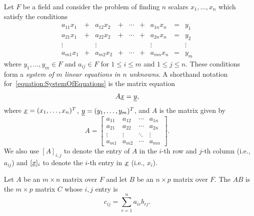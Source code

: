 Let $F$ be a field and consider the problem of finding $n$ scalars $x_1, \ldots, x_n$ which satisfy the conditions
\begin{equation} \label{equation:SystemOfEquations}
\begin{array}{ccccccccc}
a_{11} x_1 & + & a_{12} x_2 & + & \cdots & + & a_{1n} x_n & = & y_1 \\
a_{21} x_1 & + & a_{22} x_2 & + & \cdots & + & a_{2n} x_n & = & y_2 \\
\vdots & & \vdots  & & & & \vdots & & \vdots \\
a_{m1} x_1 & + & a_{m2} x_2 & + & \cdots & + & a_{mn} x_n & = & y_m
\end{array}
\end{equation}
where $y_1,\ldots,y_m \in F$ and $a_{ij} \in F$ for $1 \leq i \leq m$ and $1 \leq j \leq n$.
These conditions form a \emph{system of $m$ linear equations in $n$ unknowns}.
A shorthand notation for~\eqref{equation:SystemOfEquations} is the matrix equation
\begin{equation*}
A \underline{x} = \underline{y},
\end{equation*}
where
$\underline{x} = (x_1, \ldots, x_n)^T$, 
$\underline{y} = (y_1, \ldots, y_m)^T$, and
$A$ is the matrix given by
\begin{equation*}
A = \begin{bmatrix}
a_{11} & a_{12} & \cdots & a_{1n} \\
a_{21} & a_{22} & \cdots & a_{2n} \\
\vdots & \vdots & \ddots & \vdots \\
a_{m1} & a_{m2} & \cdots & a_{mn}
\end{bmatrix}.
\end{equation*}
We also use $[A]_{i,j}$ to denote the entry of $A$ in the $i$-th row and $j$-th column (i.e., $a_{ij}$) and $[\underline{x}]_i$ to denote the $i$-th entry in $\underline{x}$ (i.e., $x_i$).

\begin{definition}
Let $A$ be an $m \times n$ matrix over $F$ and let $B$ be an $n \times p$ matrix over $F$.
The  $AB$ is the $m \times p$ matrix $C$ whose $i,j$ entry is
\begin{equation} \label{eq:def_matrix_product}
c_{ij} = \sum_{r = 1}^n a_{ir} b_{rj}.
\end{equation}
\end{definition}


